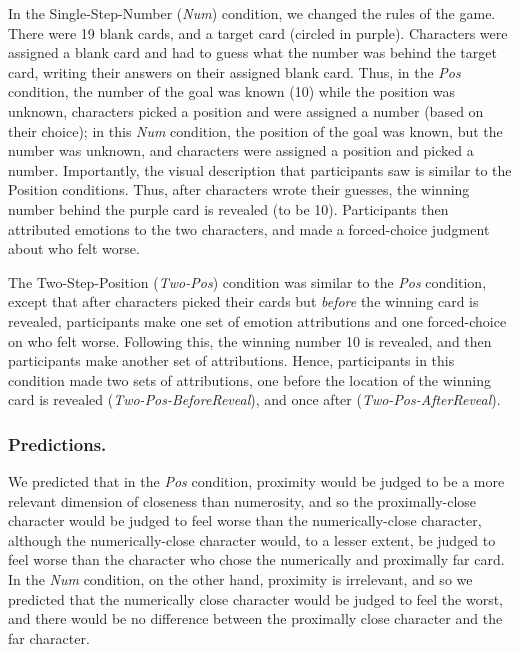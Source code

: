 \documentclass[10pt,letterpaper]{article}
\begin{document}
In the Single-Step-Number (\textit{Num}) condition, we changed the rules of the game. There were 19 blank cards, and a target card (circled in purple). Characters were assigned a blank card and had to guess what the number was behind the target card, writing their answers on their assigned blank card. Thus, in the \textit{Pos} condition, the number of the goal was known (10) while the position was unknown, characters picked a position and were assigned a number (based on their choice); in this \textit{Num} condition, the position of the goal was known, but the number was unknown, and characters were assigned a position and picked a number. Importantly, the visual description that participants saw is similar to the Position conditions. Thus, after characters wrote their guesses, the winning number behind the purple card is revealed (to be 10). Participants then attributed emotions to the two characters, and made a forced-choice judgment about who felt worse.


The Two-Step-Position (\textit{Two-Pos}) condition was similar to the \textit{Pos} condition, except that after characters picked their cards but \textit{before} the winning card is revealed, participants make one set of emotion attributions and one forced-choice on who felt worse. Following this, the winning number 10 is revealed, and then participants make another set of attributions. Hence, participants in this condition made two sets of attributions, one before the location of the winning card is revealed (\textit{Two-Pos-BeforeReveal}), and once after (\textit{Two-Pos-AfterReveal}).


\subsubsection{Predictions.}
We predicted that in the \textit{Pos} condition, proximity would be judged to be a more relevant dimension of closeness than numerosity, and so the proximally-close character would be judged to feel worse than the numerically-close character, although the numerically-close character would, to a lesser extent, be judged to feel worse than the character who chose the numerically and proximally far card. In the \textit{Num} condition, on the other hand, proximity is irrelevant, and so we predicted that the numerically close character would be judged to feel the worst, and there would be no difference between the proximally close character and the far character.
\end{document}
